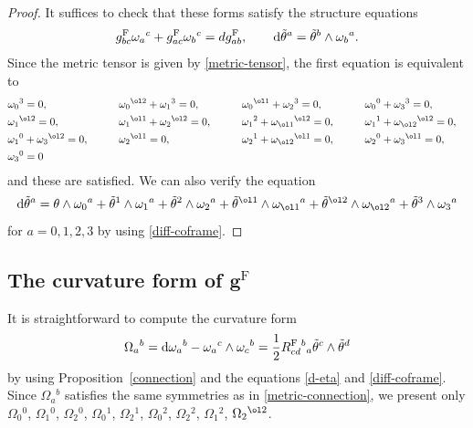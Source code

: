 \begin{proof}
It suffices to check that these forms satisfy the structure equations
\[
g^{\mathrm{F}}_{bc}\omega_a{}^c+g^{\mathrm{F}}_{ac}\omega_b{}^c=dg^{\mathrm{F}}_{ab}, \qquad
{\rm d}\tilde\theta^a=\tilde\theta^b\wedge\omega_b{}^a.
\]
Since the metric tensor is given by \eqref{metric-tensor}, the first equation is equivalent to
\begin{alignat}{5}
&\omega_0{}^3=0,\qquad&& \omega_0{}^{\ol2}+\omega_1{}^3=0,\qquad&& \omega_0{}^{\ol1}+\omega_2{}^3=0,\qquad&& \omega_0{}^0+\omega_3{}^3=0, &\nonumber\\
&\omega_1{}^{\ol2}=0,\qquad&& \omega_1{}^{\ol1}+\omega_2{}^{\ol2}=0,\qquad&& \omega_1{}^{2}+\omega_{\ol1}{}^{\ol2}=0,\qquad&& \omega_1{}^1+\omega_{\ol2}{}^{\ol2}=0,& \nonumber\\
&\omega_1{}^0+\omega_3{}^{\ol2}=0,\qquad&& \omega_2{}^{\ol1}=0,\qquad&& \omega_2{}^{1}+\omega_{\ol2}{}^{\ol1}=0,\qquad&& \omega_2{}^0+\omega_3{}^{\ol1}=0,& \nonumber\\
&\omega_3{}^0=0&\label{metric-connection}
\end{alignat}
and these are satisfied. We can also verify the equation
\[
{\rm d}\tilde\theta^a=\theta\wedge\omega_0{}^a+\tilde\theta^1\wedge\omega_1{}^a+\tilde\theta^2\wedge\omega_2{}^a+\tilde\theta^{\ol1}\wedge\omega_{\ol1}{}^a+\tilde\theta^{\ol2}\wedge\omega_{\ol2}{}^a+\tilde\theta^3\wedge\omega_3{}^a
\]
for $a=0, 1, 2, 3$ by using \eqref{diff-coframe}.
\end{proof}

\subsection[The curvature form of g\^{}F]{The curvature form of $\boldsymbol{g^{\mathrm{F}}}$}
It is straightforward to compute the curvature form
\[
\Omega_a{}^b={\rm d}\omega_a{}^b-\omega_a{}^c\wedge\omega_c{}^b
=\frac{1}{2}R^{\mathrm{F}}_{cd}{}^b{}_a \tilde\theta^c\wedge\tilde\theta^d
\]
by using Proposition~\ref{connection} and the equations \eqref{d-eta} and \eqref{diff-coframe}.
Since $\Omega_a{}^b$ satisfies the same symmetries as in \eqref{metric-connection},
we present only
$\Omega_0{}^0$, $\Omega_1{}^0$, $\Omega_2{}^0$, $\Omega_0{}^{1}$, $\Omega_2{}^1$, $\Omega_0{}^2$, $\Omega_2{}^2$, $\Omega_1{}^2$, $\Omega_2{}^{\ol2}$.

